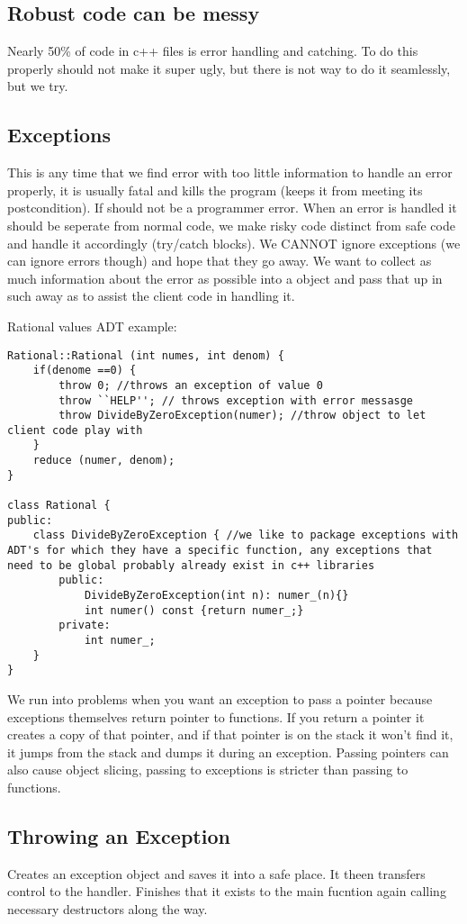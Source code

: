 \documentclass[12pt]{article}
\begin{document}
\subsection*{Robust code can be messy}
Nearly 50\% of code in c++ files is error handling and catching. To do this properly should not make it super ugly, but there is not way to do it seamlessly, but we try.
\subsection*{Exceptions}
This is any time that we find error with too little information to handle an error properly, it is usually fatal and kills the program (keeps it from meeting its postcondition). If should not be a programmer error. When an error is handled it should be seperate from normal code, we make risky code distinct from safe code and handle it accordingly (try/catch blocks). We CANNOT ignore exceptions (we can ignore errors though) and hope that they go away. We want to collect as much information about the error as possible into a object and pass that up in such away as to assist the client code in handling it.

Rational values ADT example:
\begin{verbatim}
Rational::Rational (int numes, int denom) {
    if(denome ==0) {
        throw 0; //throws an exception of value 0
        throw ``HELP''; // throws exception with error messasge
        throw DivideByZeroException(numer); //throw object to let client code play with
    }
    reduce (numer, denom);
}

class Rational {
public:
    class DivideByZeroException { //we like to package exceptions with ADT's for which they have a specific function, any exceptions that need to be global probably already exist in c++ libraries
        public:
            DivideByZeroException(int n): numer_(n){}
            int numer() const {return numer_;}
        private:
            int numer_;
    }
}
\end{verbatim}

We run into problems when you want an exception to pass a pointer because exceptions themselves return pointer to functions. If you return a pointer it creates a copy of that pointer, and if that pointer is on the stack it won't find it, it jumps from the stack and dumps it during an exception. Passing pointers can also cause object slicing, passing to exceptions is stricter than passing to functions.

\subsection*{Throwing an Exception}
Creates an exception object and saves it into a safe place. It theen transfers control to the handler. Finishes that it exists to the main fucntion again calling necessary destructors along the way.
\end{document}
